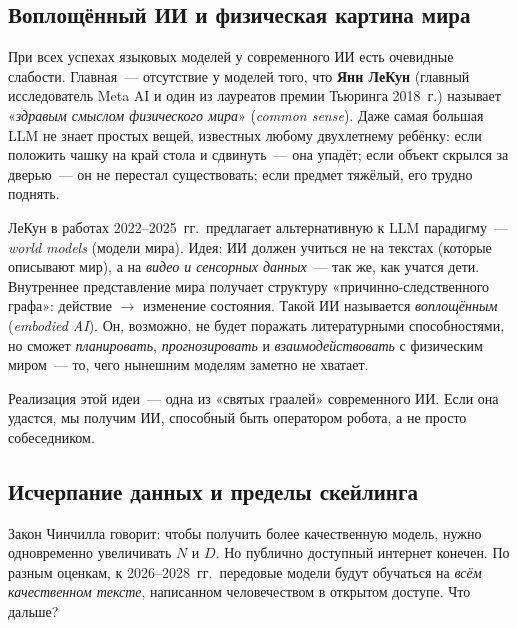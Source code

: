 \subsection{Воплощённый ИИ и физическая картина мира}
\label{ssec:embodied}

При всех успехах языковых моделей у современного ИИ есть очевидные
слабости. Главная~--- отсутствие у моделей того, что
\textbf{Янн ЛеКун} (главный исследователь Meta AI и один из лауреатов
премии Тьюринга 2018~г.) называет «\emph{здравым смыслом физического
мира}» (\emph{common sense}). Даже самая большая LLM не знает простых
вещей, известных любому двухлетнему ребёнку: если положить чашку на
край стола и сдвинуть~--- она упадёт; если объект скрылся за дверью~---
он не перестал существовать; если предмет тяжёлый, его трудно
поднять.

\begin{notebox}[title={Идея воплощённого ИИ (по ЛеКуну)}]
ЛеКун в работах 2022--2025~гг.\ предлагает альтернативную к LLM
парадигму~--- \emph{world models} (модели мира). Идея: ИИ должен
учиться не на текстах (которые описывают мир), а на \emph{видео и
сенсорных данных}~--- так же, как учатся дети. Внутреннее
представление мира получает структуру «причинно-следственного графа»:
действие $\to$ изменение состояния. Такой ИИ называется
\emph{воплощённым} (\emph{embodied AI}). Он, возможно, не будет
поражать литературными способностями, но сможет \emph{планировать},
\emph{прогнозировать} и \emph{взаимодействовать} с физическим миром~---
то, чего нынешним моделям заметно не хватает.

Реализация этой идеи~--- одна из «святых граалей» современного ИИ.
Если она удастся, мы получим ИИ, способный быть оператором робота, а
не просто собеседником.
\end{notebox}

\subsection{Исчерпание данных и пределы скейлинга}
\label{ssec:limits}

Закон Чинчилла говорит: чтобы получить более качественную модель,
нужно одновременно увеличивать $N$ и $D$. Но публично доступный
интернет конечен. По разным оценкам, к 2026--2028~гг.\ передовые модели
будут обучаться на \emph{всём качественном тексте}, написанном
человечеством в открытом доступе. Что дальше?

